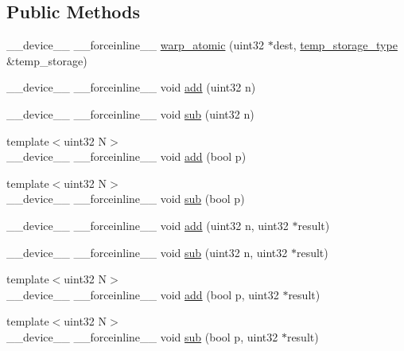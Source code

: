 \subsection*{Public Methods}
\begin{DoxyCompactItemize}
\item 
\+\_\+\+\_\+device\+\_\+\+\_\+ \+\_\+\+\_\+forceinline\+\_\+\+\_\+ \hyperlink{structcugar_1_1cuda_1_1warp__atomic_a26f81f49b364ae0054bd0064094202e3}{warp\+\_\+atomic} (uint32 $\ast$dest, \hyperlink{structcugar_1_1cuda_1_1warp__atomic_1_1temp__storage__type}{temp\+\_\+storage\+\_\+type} \&temp\+\_\+storage)
\item 
\+\_\+\+\_\+device\+\_\+\+\_\+ \+\_\+\+\_\+forceinline\+\_\+\+\_\+ void \hyperlink{structcugar_1_1cuda_1_1warp__atomic_a51a7e5ec2300729a4569caccb4347320}{add} (uint32 n)
\item 
\+\_\+\+\_\+device\+\_\+\+\_\+ \+\_\+\+\_\+forceinline\+\_\+\+\_\+ void \hyperlink{structcugar_1_1cuda_1_1warp__atomic_af1b12170646aa527cc1eaaae320dffbd}{sub} (uint32 n)
\item 
{\footnotesize template$<$uint32 N$>$ }\\\+\_\+\+\_\+device\+\_\+\+\_\+ \+\_\+\+\_\+forceinline\+\_\+\+\_\+ void \hyperlink{structcugar_1_1cuda_1_1warp__atomic_a78b3b809c6ef903abcc7d16ad1cac986}{add} (bool p)
\item 
{\footnotesize template$<$uint32 N$>$ }\\\+\_\+\+\_\+device\+\_\+\+\_\+ \+\_\+\+\_\+forceinline\+\_\+\+\_\+ void \hyperlink{structcugar_1_1cuda_1_1warp__atomic_afc825f3d2bf3d09ff343a4397ea1d737}{sub} (bool p)
\item 
\+\_\+\+\_\+device\+\_\+\+\_\+ \+\_\+\+\_\+forceinline\+\_\+\+\_\+ void \hyperlink{structcugar_1_1cuda_1_1warp__atomic_a9557611c92ecb065e6fefa030cb2c4a4}{add} (uint32 n, uint32 $\ast$result)
\item 
\+\_\+\+\_\+device\+\_\+\+\_\+ \+\_\+\+\_\+forceinline\+\_\+\+\_\+ void \hyperlink{structcugar_1_1cuda_1_1warp__atomic_a2ad91303e179d17d88aa75f1f0d46602}{sub} (uint32 n, uint32 $\ast$result)
\item 
{\footnotesize template$<$uint32 N$>$ }\\\+\_\+\+\_\+device\+\_\+\+\_\+ \+\_\+\+\_\+forceinline\+\_\+\+\_\+ void \hyperlink{structcugar_1_1cuda_1_1warp__atomic_a3d7c404b15721514df19945f48272d37}{add} (bool p, uint32 $\ast$result)
\item 
{\footnotesize template$<$uint32 N$>$ }\\\+\_\+\+\_\+device\+\_\+\+\_\+ \+\_\+\+\_\+forceinline\+\_\+\+\_\+ void \hyperlink{structcugar_1_1cuda_1_1warp__atomic_a84b549dd579a499a661c38bb482d7ff8}{sub} (bool p, uint32 $\ast$result)
\end{DoxyCompactItemize}
